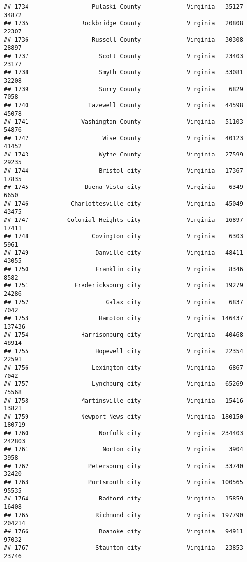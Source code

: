 \documentclass[
]{article}
\begin{document}
\begin{verbatim}
## 1734                  Pulaski County             Virginia   35127   34872
## 1735               Rockbridge County             Virginia   20808   22307
## 1736                  Russell County             Virginia   30308   28897
## 1737                    Scott County             Virginia   23403   23177
## 1738                    Smyth County             Virginia   33081   32208
## 1739                    Surry County             Virginia    6829    7058
## 1740                 Tazewell County             Virginia   44598   45078
## 1741               Washington County             Virginia   51103   54876
## 1742                     Wise County             Virginia   40123   41452
## 1743                    Wythe County             Virginia   27599   29235
## 1744                    Bristol city             Virginia   17367   17835
## 1745                Buena Vista city             Virginia    6349    6650
## 1746            Charlottesville city             Virginia   45049   43475
## 1747           Colonial Heights city             Virginia   16897   17411
## 1748                  Covington city             Virginia    6303    5961
## 1749                   Danville city             Virginia   48411   43055
## 1750                   Franklin city             Virginia    8346    8582
## 1751             Fredericksburg city             Virginia   19279   24286
## 1752                      Galax city             Virginia    6837    7042
## 1753                    Hampton city             Virginia  146437  137436
## 1754               Harrisonburg city             Virginia   40468   48914
## 1755                   Hopewell city             Virginia   22354   22591
## 1756                  Lexington city             Virginia    6867    7042
## 1757                  Lynchburg city             Virginia   65269   75568
## 1758               Martinsville city             Virginia   15416   13821
## 1759               Newport News city             Virginia  180150  180719
## 1760                    Norfolk city             Virginia  234403  242803
## 1761                     Norton city             Virginia    3904    3958
## 1762                 Petersburg city             Virginia   33740   32420
## 1763                 Portsmouth city             Virginia  100565   95535
## 1764                    Radford city             Virginia   15859   16408
## 1765                   Richmond city             Virginia  197790  204214
## 1766                    Roanoke city             Virginia   94911   97032
## 1767                   Staunton city             Virginia   23853   23746

\end{verbatim}
\end{document}
